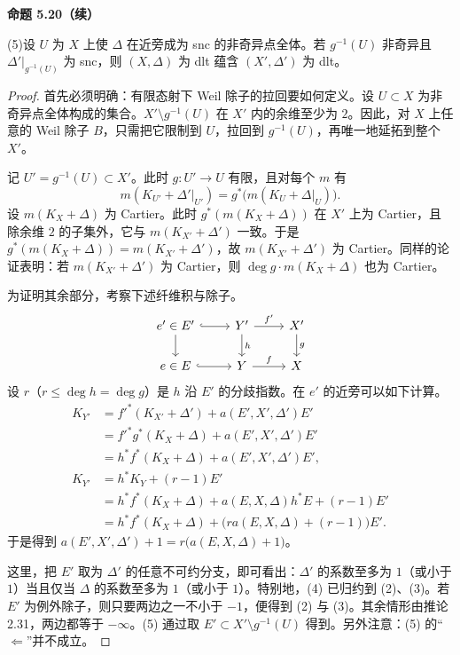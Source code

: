 \par\medskip\noindent\textbf{命题 5.20（续）}\quad

(5)\quad 设 $U$ 为 $X$ 上使 $\Delta$ 在近旁成为 snc 的非奇异点全体。若 $g^{-1}(U)$ 非奇异且 $\Delta'|_{g^{-1}(U)}$ 为 snc，则 $(X,\Delta)$ 为 dlt 蕴含 $(X',\Delta')$ 为 dlt。

\begin{proof}
首先必须明确：有限态射下 Weil 除子的拉回要如何定义。设 $U\subset X$ 为非奇异点全体构成的集合。$X'\setminus g^{-1}(U)$ 在 $X'$ 内的余维至少为 $2$。因此，对 $X$ 上任意的 Weil 除子 $B$，只需把它限制到 $U$，拉回到 $g^{-1}(U)$，再唯一地延拓到整个 $X'$。

记 $U'=g^{-1}(U)\subset X'$。此时 $g\colon U'\to U$ 有限，且对每个 $m$ 有
\[
m(K_{U'}+\Delta'|_{U'})=g^*\bigl(m(K_U+\Delta|_U)\bigr).
\]
设 $m(K_X+\Delta)$ 为 Cartier。此时 $g^*(m(K_X+\Delta))$ 在 $X'$ 上为 Cartier，且除余维 $2$ 的子集外，它与 $m(K_{X'}+\Delta')$ 一致。于是 $g^*(m(K_X+\Delta))=m(K_{X'}+\Delta')$，故 $m(K_{X'}+\Delta')$ 为 Cartier。同样的论证表明：若 $m(K_{X'}+\Delta')$ 为 Cartier，则 $\deg g\cdot m(K_X+\Delta)$ 也为 Cartier。

为证明其余部分，考察下述纤维积与除子。
\[
\begin{tikzcd}
e'\in E' \arrow[r,hook] \arrow[d] & Y' \arrow[r,"f'"] \arrow[d,"h"] & X' \arrow[d,"g"] \\
e\in E \arrow[r,hook] & Y \arrow[r,"f"] & X
\end{tikzcd}
\]
设 $r$（$r\le\deg h=\deg g$）是 $h$ 沿 $E'$ 的分歧指数。在 $e'$ 的近旁可以如下计算。
\[
\begin{aligned}
K_{Y'} &= f'^*(K_{X'}+\Delta')+a(E',X',\Delta')E'\\
&= f'^*g^*(K_X+\Delta)+a(E',X',\Delta')E'\\
&= h^*f^*(K_X+\Delta)+a(E',X',\Delta')E',\\
K_{Y'} &= h^*K_Y+(r-1)E'\\
&= h^*f^*(K_X+\Delta)+a(E,X,\Delta)h^*E+(r-1)E'\\
&= h^*f^*(K_X+\Delta)+\bigl(ra(E,X,\Delta)+(r-1)\bigr)E'.
\end{aligned}
\]
于是得到 $a(E',X',\Delta')+1=r\bigl(a(E,X,\Delta)+1\bigr)$。

这里，把 $E'$ 取为 $\Delta'$ 的任意不可约分支，即可看出：$\Delta'$ 的系数至多为 $1$（或小于 $1$）当且仅当 $\Delta$ 的系数至多为 $1$（或小于 $1$）。特别地，(4) 已归约到 (2)、(3)。若 $E'$ 为例外除子，则只要两边之一不小于 $-1$，便得到 (2) 与 (3)。其余情形由推论 2.31，两边都等于 $-\infty$。(5) 通过取 $E'\subset X'\setminus g^{-1}(U)$ 得到。另外注意：(5) 的“$\Leftarrow$”并不成立。
\end{proof}

